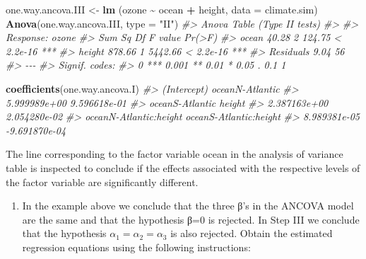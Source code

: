 \documentclass[
]{book}
\newenvironment{Shaded}{\begin{snugshade}}{\end{snugshade}}
\newcommand{\AttributeTok}[1]{\textcolor[rgb]{0.13,0.29,0.53}{#1}}
\newcommand{\CommentTok}[1]{\textcolor[rgb]{0.56,0.35,0.01}{\textit{#1}}}
\newcommand{\FunctionTok}[1]{\textcolor[rgb]{0.13,0.29,0.53}{\textbf{#1}}}
\newcommand{\NormalTok}[1]{#1}
\newcommand{\OtherTok}[1]{\textcolor[rgb]{0.56,0.35,0.01}{#1}}
\newcommand{\SpecialCharTok}[1]{\textcolor[rgb]{0.81,0.36,0.00}{\textbf{#1}}}
\newcommand{\StringTok}[1]{\textcolor[rgb]{0.31,0.60,0.02}{#1}}
\providecommand{\tightlist}{%
  \setlength{\itemsep}{0pt}\setlength{\parskip}{0pt}}
\begin{document}
\begin{Shaded}
\begin{Highlighting}[]
\NormalTok{one.way.ancova.III }\OtherTok{\textless{}{-}} \FunctionTok{lm}\NormalTok{ (ozone }\SpecialCharTok{\textasciitilde{}}\NormalTok{ ocean }\SpecialCharTok{+}\NormalTok{ height, }\AttributeTok{data =}\NormalTok{ climate.sim)}
\FunctionTok{Anova}\NormalTok{(one.way.ancova.III, }\AttributeTok{type =} \StringTok{"II"}\NormalTok{)}
\CommentTok{\#\textgreater{} Anova Table (Type II tests)}
\CommentTok{\#\textgreater{} }
\CommentTok{\#\textgreater{} Response: ozone}
\CommentTok{\#\textgreater{}           Sum Sq Df F value    Pr(\textgreater{}F)    }
\CommentTok{\#\textgreater{} ocean      40.28  2  124.75 \textless{} 2.2e{-}16 ***}
\CommentTok{\#\textgreater{} height    878.66  1 5442.66 \textless{} 2.2e{-}16 ***}
\CommentTok{\#\textgreater{} Residuals   9.04 56                      }
\CommentTok{\#\textgreater{} {-}{-}{-}}
\CommentTok{\#\textgreater{} Signif. codes:  }
\CommentTok{\#\textgreater{} 0 \textquotesingle{}***\textquotesingle{} 0.001 \textquotesingle{}**\textquotesingle{} 0.01 \textquotesingle{}*\textquotesingle{} 0.05 \textquotesingle{}.\textquotesingle{} 0.1 \textquotesingle{} \textquotesingle{} 1}

\FunctionTok{coefficients}\NormalTok{(one.way.ancova.I)}
\CommentTok{\#\textgreater{}            (Intercept)        oceanN{-}Atlantic }
\CommentTok{\#\textgreater{}           5.999989e+00           9.596618e{-}01 }
\CommentTok{\#\textgreater{}        oceanS{-}Atlantic                 height }
\CommentTok{\#\textgreater{}           2.387163e+00           2.054280e{-}02 }
\CommentTok{\#\textgreater{} oceanN{-}Atlantic:height oceanS{-}Atlantic:height }
\CommentTok{\#\textgreater{}           8.989381e{-}05          {-}9.691870e{-}04}
\end{Highlighting}
\end{Shaded}

The line corresponding to the factor variable ocean in the analysis of variance table is inspected to conclude if the effects associated with the respective levels of the factor variable are significantly different.

\begin{enumerate}
\def\labelenumi{(\roman{enumi})}
\tightlist
\item
  In the example above we conclude that the three β's in the ANCOVA model are the same and that the hypothesis β=0 is rejected. In Step III we conclude that the hypothesis \(\alpha_1 = \alpha_2 = \alpha_3\) is also rejected. Obtain the estimated regression equations using the following instructions:
\end{enumerate}
\end{document}
